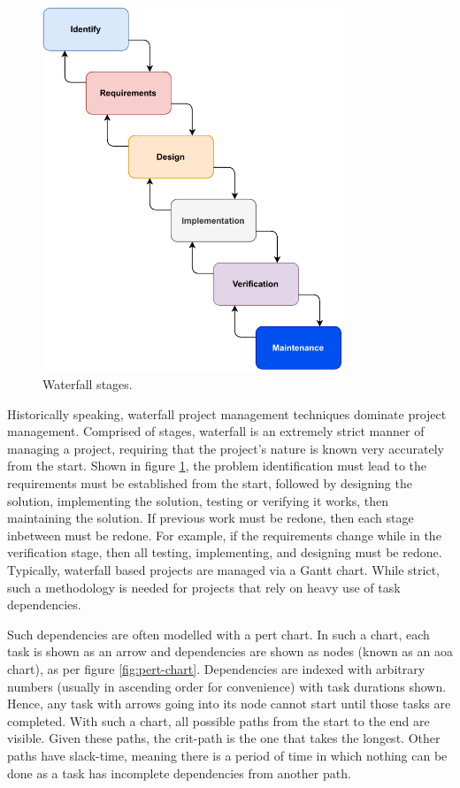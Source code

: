 \documentclass[11pt]{article}
\begin{document}
\begin{figure}[b!]
    \centering
    \includegraphics[width=0.8\textwidth]{figures/waterfall_model.pdf}
    \caption{Waterfall stages.}
    \label{fig:waterfall}
\end{figure}

Historically speaking, \gls{waterfall} project management techniques dominate project management. Comprised of stages, \gls{waterfall} is an extremely strict manner of managing a project, requiring that the project's nature is known very accurately from the start. Shown in figure \ref{fig:waterfall}, the problem identification must lead to the requirements must be established from the start, followed by designing the solution, implementing the solution, testing or verifying it works, then maintaining the solution. If previous work must be redone, then each stage inbetween must be redone. For example, if the requirements change while in the verification stage, then all testing, implementing, and designing must be redone. Typically, \gls{waterfall} based projects are managed via a Gantt chart. While strict, such a methodology is needed for projects that rely on heavy use of task dependencies.

Such dependencies are often modelled with a \acrfull{pert} chart. In such a chart, each task is shown as an arrow and dependencies are shown as nodes (known as an \acrfull{aoa} chart), as per figure \ref{fig:pert-chart}. Dependencies are indexed with arbitrary numbers (usually in ascending order for convenience) with task durations shown. Hence, any task with arrows going into its node cannot start until those tasks are completed. With such a chart, all possible paths from the start to the end are visible. Given these paths, the \gls{crit-path} is the one that takes the longest. Other paths have \gls{slack-time}, meaning there is a period of time in which nothing can be done as a task has incomplete dependencies from another path.
\end{document}
